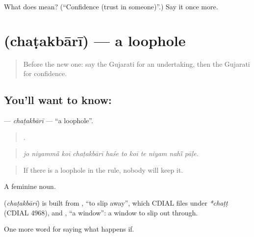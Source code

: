 \begin{tcolorbox}[breakable,colback=teal!4,colframe=teal!35!black,title={Before you move on}]
What does  mean? (\textquotedblleft{}Confidence (trust in someone)\textquotedblright{}.) Say it once more.
\end{tcolorbox}
\section[\texorpdfstring{\gu{છટકબારી} (chaṭakbārī)}{છટકબારી (chaṭakbārī)}]{ (chaṭakbārī) — a loophole}

\label{lesson:GU-C541-chatakbari}



\begin{quote}
Before the new one: say the Gujarati for an undertaking, then the Gujarati for confidence.
\end{quote}

\subsection*{You'll want to know: }
\textbf{} — \emph{chaṭakbārī} — \textquotedblleft{}a loophole\textquotedblright{}.

\begin{quote}
          .
\end{quote}

\begin{quote}
\emph{jo niyammā̃ koī chaṭakbārī haśe to koī te niyam nahī̃ pāḷe.}
\end{quote}

\begin{quote}
If there is a loophole in the rule, nobody will keep it.
\end{quote}

A feminine noun.

\begin{cousinweb}
\textbf{} (\emph{chaṭakbārī}) is built from \textbf{}, \textquotedblleft{}to slip away\textquotedblright{}, which CDIAL files under \emph{*chaṭṭ} (CDIAL 4968), and \textbf{}, \textquotedblleft{}a window\textquotedblright{}: a window to slip out through.
\end{cousinweb}

\begin{grammarlens}[title={What you've built}]
One more word for saying what happens if.
\end{grammarlens}

